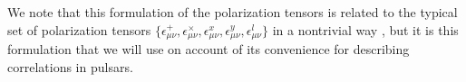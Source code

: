 \documentclass[prd,twocolumn,aps,psfig,nofootinbib,nobibnotes,superscriptaddress,preprintnumbers,times]{revtex4-2}
\begin{document}
We note that this formulation of the polarization tensors is related to the typical set of polarization tensors $\{\epsilon_{\mu\nu}^+, \epsilon_{\mu\nu}^\times, \epsilon_{\mu\nu}^x, \epsilon_{\mu\nu}^y, \epsilon_{\mu\nu}^l \}$ in a nontrivial way \cite{Liang:2021bct}, but it is this formulation that we will use on account of its convenience for describing correlations in pulsars.


\clearpage
\end{document}
